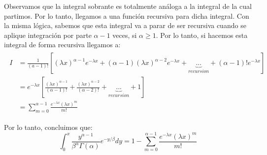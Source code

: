 \documentclass[12pt]{article}
\begin{document}
          \newpage Observamos que la integral sobrante es totalmente análoga a la integral de la cual partimos. Por lo tanto, llegamos a una función recursiva para dicha integral. Con la misma lógica, sabemos que esta integral va a parar de ser recursiva cuando se aplique integración por parte $\alpha - 1$ veces, si $\alpha \ge 1$. Por lo tanto, si hacemos esta integral de forma recursiva llegamos a:
          \begin{align}
              \begin{aligned}
                  I & =\frac { 1 }{ (a-1)! } \left[ (\lambda x)^{ \alpha -1 }{ e }^{ -\lambda x }+(\alpha -1){ (\lambda x) }^{ \alpha -2 }{ e }^{ -\lambda x }+\underset { recursion }{ \underbrace { ... }  } +(\alpha -1)!{ e }^{ -\lambda x } \right] \\ 
                  & ={ e }^{ -\lambda x }\left[ \frac { { (\lambda x) }^{ \alpha -1 } }{ (\alpha -1)! } +\frac { { (\lambda x) }^{ \alpha -2 } }{ (\alpha -2)! } +\underset { recursion }{ \underbrace { ... }  } + 1 \right] \\
                  & =\sum _{ m=0 }^{ \alpha -1 }{ \frac { { e }^{ -\lambda x }{ (\lambda x) }^{ m } }{ m! }  } 
              \end{aligned}
          \end{align}

          Por lo tanto, concluimos que: 
          \begin{equation}
              \int _{ 0 }^{ x }{ \frac { { y }^{ \alpha -1 } }{ { \beta  }^{ \alpha  }\Gamma (\alpha ) } { e }^{ -y/\beta  }dy } =1-\sum _{ m=0 }^{ \alpha -1 }{ \frac { { e }^{ -\lambda x }{ (\lambda x) }^{ m } }{ m! }  } 
          \end{equation}
\end{document}
